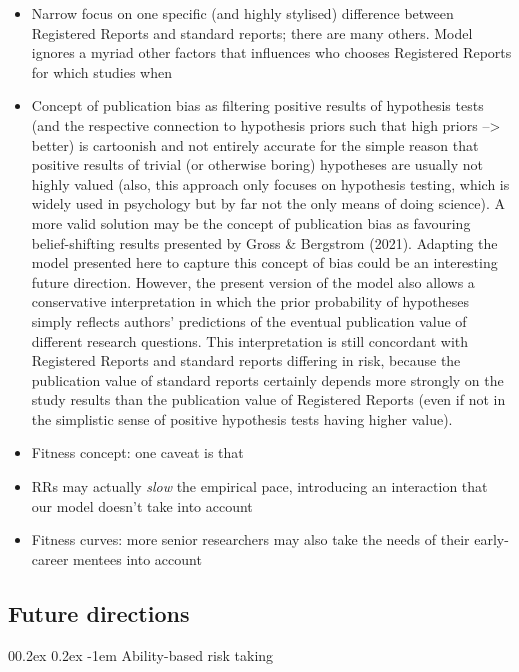 \documentclass[
  ,man,mask,floatsintext]{apa6}
\makeatletter
\let\oldparagraph\paragraph
\renewcommand{\paragraph}[1]{\oldparagraph{#1}\mbox{}}
\renewcommand{\paragraph}{\@startsection{paragraph}{4}{\parindent}%
  {0\baselineskip \@plus 0.2ex \@minus 0.2ex}%
  {-1em}%
  {\normalfont\normalsize\bfseries\itshape\typesectitle}}
\makeatother
\begin{document}
\begin{itemize}
\item
  Narrow focus on one specific (and highly stylised) difference between Registered Reports and standard reports; there are many others. Model ignores a myriad other factors that influences who chooses Registered Reports for which studies when
\item
  Concept of publication bias as filtering positive results of hypothesis tests (and the respective connection to hypothesis priors such that high priors --\textgreater{} better) is cartoonish and not entirely accurate for the simple reason that positive results of trivial (or otherwise boring) hypotheses are usually not highly valued (also, this approach only focuses on hypothesis testing, which is widely used in psychology but by far not the only means of doing science).
  A more valid solution may be the concept of publication bias as favouring belief-shifting results presented by Gross \& Bergstrom (2021).
  Adapting the model presented here to capture this concept of bias could be an interesting future direction.
  However, the present version of the model also allows a conservative interpretation in which the prior probability of hypotheses simply reflects authors' predictions of the eventual publication value of different research questions.
  This interpretation is still concordant with Registered Reports and standard reports differing in risk, because the publication value of standard reports certainly depends more strongly on the study results than the publication value of Registered Reports (even if not in the simplistic sense of positive hypothesis tests having higher value).
\item
  Fitness concept: one caveat is that
\item
  RRs may actually \emph{slow} the empirical pace, introducing an interaction that our model doesn't take into account
\item
  Fitness curves: more senior researchers may also take the needs of their early-career mentees into account
\end{itemize}

\hypertarget{future-directions}{%
\subsection{Future directions}\label{future-directions}}

\hypertarget{ability-based-risk-taking}{%
\paragraph{Ability-based risk taking}\label{ability-based-risk-taking}}
\end{document}
